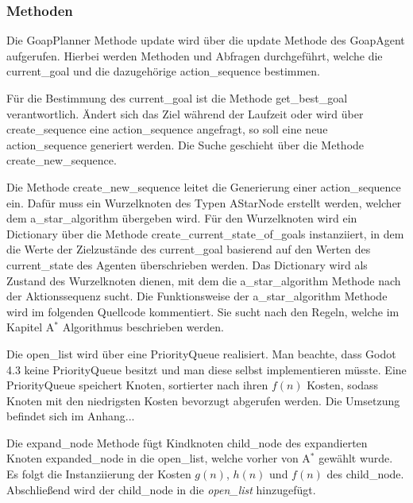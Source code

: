 \subsubsection{Methoden}

Die GoapPlanner Methode update wird über die update Methode des GoapAgent aufgerufen. Hierbei werden Methoden und Abfragen durchgeführt, welche die current\_goal und die dazugehörige action\_sequence bestimmen. 

Für die Bestimmung des current\_goal ist die Methode get\_best\_goal verantwortlich. Ändert sich das Ziel während der Laufzeit oder wird über create\_sequence eine action\_sequence angefragt, so soll eine neue action\_sequence generiert werden. Die Suche geschieht über die Methode create\_new\_sequence. 



Die Methode create\_new\_sequence leitet die Generierung einer action\_sequence ein. Dafür muss ein Wurzelknoten des Typen AStarNode erstellt werden, welcher dem a\_star\_algorithm übergeben wird. Für den Wurzelknoten wird ein Dictionary über die Methode create\_current\_state\_of\_goals instanziiert, in dem die Werte der Zielzustände des current\_goal basierend auf den Werten des current\_state des Agenten überschrieben werden. Das Dictionary wird als Zustand des Wurzelknoten dienen, mit dem die a\_star\_algorithm Methode nach der Aktionssequenz sucht. Die Funktionsweise der a\_star\_algorithm Methode wird im folgenden Quellcode kommentiert. Sie sucht nach den Regeln, welche im Kapitel A$^*$ Algorithmus beschrieben werden.



Die open\_list wird über eine PriorityQueue realisiert. Man beachte, dass Godot 4.3 keine PriorityQueue besitzt und man diese selbst implementieren müsste. Eine PriorityQueue speichert Knoten, sortierter nach ihren $f(n)$ Kosten, sodass Knoten mit den niedrigsten Kosten bevorzugt abgerufen werden. Die Umsetzung befindet sich im Anhang...

Die expand\_node Methode fügt Kindknoten child\_node des expandierten Knoten expanded\_node in die open\_list, welche vorher von A$^*$ gewählt wurde. Es folgt die Instanziierung der Kosten $g(n)$, $h(n)$ und $f(n)$ des child\_node. Abschließend wird der child\_node in die \textit{open\_list} hinzugefügt.

